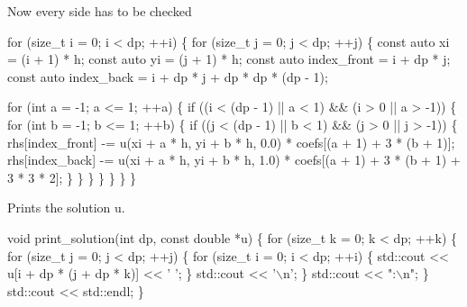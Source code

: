 Now every side has to be checked


\begin{DoxyCode}
    \textcolor{keywordflow}{for} (\textcolor{keywordtype}{size\_t} i = 0; i < dp; ++i) \{
        \textcolor{keywordflow}{for} (\textcolor{keywordtype}{size\_t} j = 0; j < dp; ++j) \{
            \textcolor{keyword}{const} \textcolor{keyword}{auto} xi = (i + 1) * h;
            \textcolor{keyword}{const} \textcolor{keyword}{auto} yi = (j + 1) * h;
            \textcolor{keyword}{const} \textcolor{keyword}{auto} index\_front = i + dp * j;
            \textcolor{keyword}{const} \textcolor{keyword}{auto} index\_back = i + dp * j + dp * dp * (dp - 1);

            \textcolor{keywordflow}{for} (\textcolor{keywordtype}{int} a = -1; a <= 1; ++a) \{
                \textcolor{keywordflow}{if} ((i < (dp - 1) || a < 1) && (i > 0 || a > -1)) \{
                    \textcolor{keywordflow}{for} (\textcolor{keywordtype}{int} b = -1; b <= 1; ++b) \{
                        \textcolor{keywordflow}{if} ((j < (dp - 1) || b < 1) && (j > 0 || j > -1)) \{
                            rhs[index\_front] -= u(xi + a * h, yi + b * h, 0.0) *
                                                coefs[(a + 1) + 3 * (b + 1)];
                            rhs[index\_back] -=
                                u(xi + a * h, yi + b * h, 1.0) *
                                coefs[(a + 1) + 3 * (b + 1) + 3 * 3 * 2];
                        \}
                    \}
                \}
            \}
        \}
    \}
\}
\end{DoxyCode}


Prints the solution {\ttfamily u}.


\begin{DoxyCode}
\textcolor{keywordtype}{void} print\_solution(\textcolor{keywordtype}{int} dp, \textcolor{keyword}{const} \textcolor{keywordtype}{double} *u)
\{
    \textcolor{keywordflow}{for} (\textcolor{keywordtype}{size\_t} k = 0; k < dp; ++k) \{
        \textcolor{keywordflow}{for} (\textcolor{keywordtype}{size\_t} j = 0; j < dp; ++j) \{
            \textcolor{keywordflow}{for} (\textcolor{keywordtype}{size\_t} i = 0; i < dp; ++i) \{
                std::cout << u[i + dp * (j + dp * k)] << \textcolor{charliteral}{' '};
            \}
            std::cout << \textcolor{charliteral}{'\(\backslash\)n'};
        \}
        std::cout << \textcolor{stringliteral}{":\(\backslash\)n"};
    \}
    std::cout << std::endl;
\}
\end{DoxyCode}


